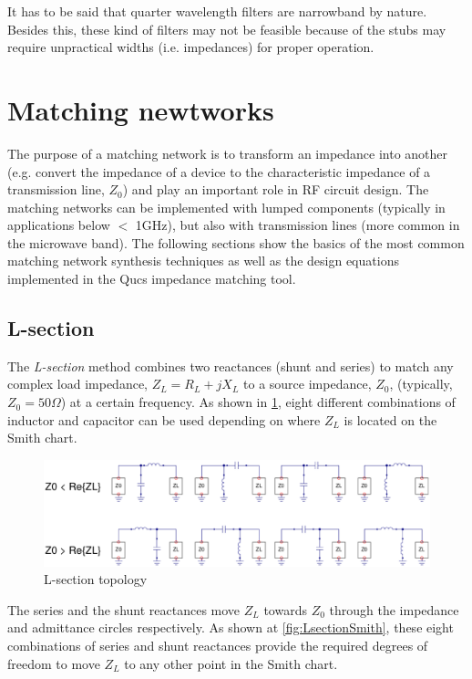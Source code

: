 \noindent It has to be said that quarter wavelength filters are narrowband by nature. Besides this, these kind of filters may not be feasible because of the stubs may require unpractical widths (i.e. impedances) for proper operation.


\section{Matching newtworks}
The purpose of a matching network is to transform an impedance into another (e.g. convert the impedance of a device to the characteristic impedance of a transmission line, $Z_0$) and play an important role in RF circuit design. The matching networks can be implemented with lumped components (typically in applications below $<$ 1GHz), but also with transmission lines (more common in the microwave band). The following sections show the basics of the most common matching network synthesis techniques as well as the design equations implemented in the Qucs impedance matching tool.

\subsection{L-section}
The \textit{L-section} method combines two reactances (shunt and series) to match any complex load impedance, $Z_L = R_L + jX_L$ to a source impedance, $Z_0$, (typically, $Z_0 = 50\Omega$) at a certain frequency. As shown in \ref{fig:Lsection}, eight different combinations of inductor and capacitor can be used depending on where $Z_L$ is located on the Smith chart.

\begin{figure}[H]
\centering
\includegraphics[width=120mm]{Lsection}
\caption{L-section topology}
\label{fig:Lsection}
\end{figure}

The series and the shunt reactances move $Z_L$ towards $Z_0$ through the impedance and admittance circles respectively. As shown at \ref{fig:LsectionSmith}, these eight combinations of series and shunt reactances provide the required degrees of freedom to move $Z_L$ to any other point in the Smith chart.


